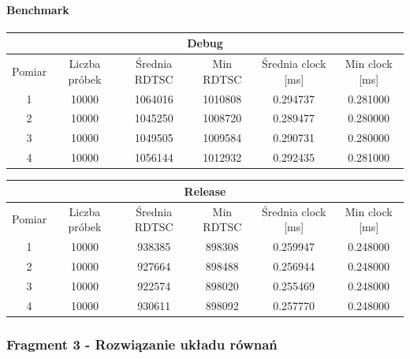 \documentclass{article}
\begin{document}
	\paragraph{Benchmark}
	\begin{center}
		\begin{tabular}{|c|c|c|c|c|c|} \hline
			\multicolumn{6}{|c|}{Debug} \\\hline
			Pomiar  & Liczba próbek & Średnia RDTSC & Min RDTSC & Średnia clock [ms] & Min clock [ms] \\\hline
			\hline
			1 & 10000 & 1064016 & 1010808 & 0.294737 & 0.281000 \\\hline
			2 & 10000 & 1045250 & 1008720 & 0.289477 & 0.280000 \\\hline
			3 & 10000 & 1049505 & 1009584 & 0.290731 & 0.280000 \\\hline
			4 & 10000 & 1056144 & 1012932 & 0.292435 & 0.281000 \\\hline
			
		\end{tabular}
	\end{center}
	\begin{center}
		\begin{tabular}{|c|c|c|c|c|c|} \hline
			\multicolumn{6}{|c|}{Release} \\\hline
			Pomiar  & Liczba próbek & Średnia RDTSC & Min RDTSC & Średnia clock [ms] & Min clock [ms] \\\hline
			\hline
			1 & 10000 & 938385 & 898308 & 0.259947 & 0.248000 \\\hline
			2 & 10000 & 927664 & 898488 & 0.256944 & 0.248000 \\\hline
			3 & 10000 & 922574 & 898020 & 0.255469 & 0.248000 \\\hline
			4 & 10000 & 930611 & 898092 & 0.257770 & 0.248000 \\\hline
			
		\end{tabular}
	\end{center}
	
	
	\pagebreak
	\subsubsection{Fragment 3 - Rozwiązanie układu równań}
\end{document}
